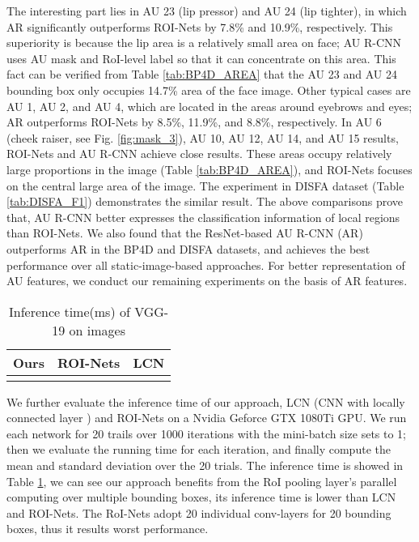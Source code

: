 \documentclass[5p,twocolumn]{elsarticle}
\begin{document}
The interesting part lies in AU 23 (lip pressor) and AU 24 (lip tighter), in which AR significantly outperforms ROI-Nets by 7.8\% and 10.9\%, respectively. This superiority is because the lip area is a relatively small area on face; AU R-CNN uses AU mask and RoI-level label so that it can concentrate on this area. This fact can be verified from Table \ref{tab:BP4D_AREA} that the AU 23 and AU 24 bounding box only occupies 14.7\% area of the face image. 
Other typical cases are AU 1, AU 2, and AU 4, which are located in the areas around eyebrows and eyes; AR outperforms ROI-Nets by 8.5\%, 11.9\%, and 8.8\%, respectively. In AU 6 (cheek raiser, see Fig. \ref{fig:mask_3}), AU 10, AU 12, AU 14, and AU 15 results, ROI-Nets and AU R-CNN achieve close results. These areas occupy relatively large proportions in the image (Table \ref{tab:BP4D_AREA}), and ROI-Nets focuses on the central large area of the image. The experiment in DISFA dataset (Table \ref{tab:DISFA_F1}) demonstrates the similar result. The above comparisons prove that, AU R-CNN better expresses the classification information of local regions than ROI-Nets. We also found that the ResNet-based AU R-CNN (AR) outperforms AR in the BP4D and DISFA datasets, and achieves the best performance over all static-image-based approaches. For better representation of AU features, we conduct our remaining experiments on the basis of AR features.

\begin{table}[htp]
	\scriptsize	
	\setlength{\abovecaptionskip}{0pt}
	\setlength{\abovecaptionskip}{0pt}
	\caption{Inference time(ms) of VGG-19 on  images}
	\label{tab:running_time}
	\centering
	\tabcolsep=0.15cm
	\begin{tabular}{ccc}
		\toprule
		Ours & ROI-Nets \cite{li2017action} & LCN \cite{taigman2014deepface} \\
		\midrule
		 &  &  \\
		\bottomrule
	\end{tabular}
\end{table}
We further evaluate the inference time of our approach, LCN (CNN with locally connected layer \cite{taigman2014deepface}) and ROI-Nets on a Nvidia Geforce GTX 1080Ti GPU. We run each network for 20 trails over \num{1000} iterations with the mini-batch size sets to 1; then we evaluate the running time for each iteration, and finally compute the mean and standard deviation over the 20 trials. The inference time is showed in Table \ref{tab:running_time}, we can see our approach benefits from the RoI pooling layer's parallel computing over multiple bounding boxes, its inference time is lower than LCN and ROI-Nets. The RoI-Nets adopt 20 individual conv-layers for 20 bounding boxes, thus it results worst performance.
\end{document}
